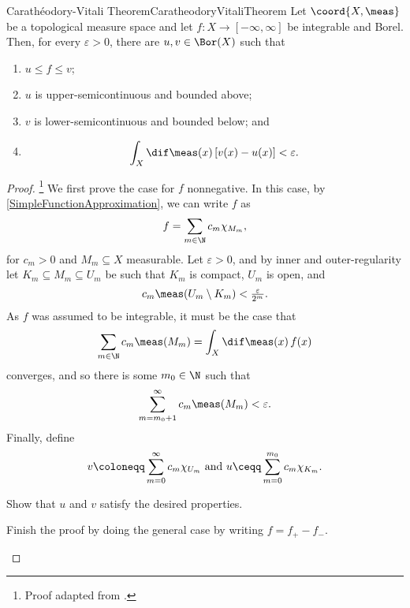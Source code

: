 \begin{thm}{Carathéodory-Vitali Theorem}{CaratheodoryVitaliTheorem}
Let $\coord{X,\meas}$ be a topological measure space and let $f\colon X\rightarrow [-\infty ,\infty ]$ be integrable and Borel.  Then, for every $\varepsilon >0$, there are $u,v\in \Bor (X)$ such that
\begin{enumerate}
\item $u\leq f\leq v$;
\item $u$ is upper-semicontinuous and bounded above;
\item $v$ is lower-semicontinuous and bounded below; and
\item
\begin{equation}
\int _X\dif \meas (x)\, [v(x)-u(x)]<\varepsilon .
\end{equation}
\end{enumerate}
\begin{proof}\footnote{Proof adapted from \cite[pg.~56]{BigRudin}.}
We first prove the case for $f$ nonnegative.  In this case, by \cref{SimpleFunctionApproximation}, we can write $f$ as
\begin{equation}
f=\sum _{m\in \N}c_m\chi _{M_m},
\end{equation}
for $c_m>0$ and $M_m\subseteq X$ measurable.  Let $\varepsilon >0$, and by inner and outer-regularity let $K_m\subseteq M_m\subseteq U_m$ be such that $K_m$ is compact, $U_m$ is open, and
\begin{equation}
c_m\meas (U_m\setminus K_m)<\tfrac{\varepsilon}{2^m}.
\end{equation}
As $f$ was assumed to be integrable, it must be the case that
\begin{equation}
\sum _{m\in \N}c_m\meas (M_m)=\int _X\dif \meas (x)\, f(x)
\end{equation}
converges, and so there is some $m_0\in \N$ such that
\begin{equation}
\sum _{m=m_0+1}^\infty c_m\meas (M_m)<\varepsilon .
\end{equation}
Finally, define
\begin{equation}
v\coloneqq \sum _{m=0}^\infty c_m\chi _{U_m}\text{ and }u\ceqq \sum _{m=0}^{m_0}c_m\chi _{K_m}.
\end{equation}
\begin{exr}[breakable=false]{}{}
Show that $u$ and $v$ satisfy the desired properties.
\end{exr}
\begin{exr}[breakable=false]{}{}
Finish the proof by doing the general case by writing $f=f_+-f_-$.
\end{exr}
\end{proof}
\end{thm}

